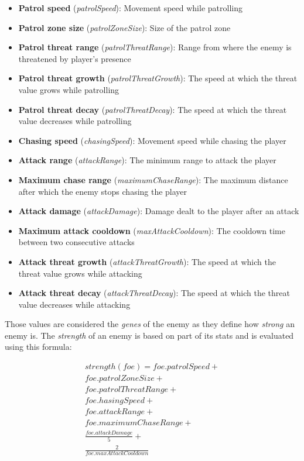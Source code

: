 \documentclass[11pt]{article}
\begin{document}
\begin{itemize}
  \item \textbf{Patrol speed} (\textit{patrolSpeed}): Movement speed while patrolling
  \item \textbf{Patrol zone size} (\textit{patrolZoneSize}): Size of the patrol zone
  \item \textbf{Patrol threat range} (\textit{patrolThreatRange}): Range from where the enemy is threatened by player's presence
  \item \textbf{Patrol threat growth} (\textit{patrolThreatGrowth}): The speed at which the threat value grows while patrolling
  \item \textbf{Patrol threat decay} (\textit{patrolThreatDecay}): The speed at which the threat value decreases while patrolling

  \item \textbf{Chasing speed} (\textit{chasingSpeed}): Movement speed while chasing the player
  \item \textbf{Attack range} (\textit{attackRange}): The minimum range to attack the player
  \item \textbf{Maximum chase range} (\textit{maximumChaseRange}): The maximum distance after which the enemy stops chasing the player
  \item \textbf{Attack damage} (\textit{attackDamage}): Damage dealt to the player after an attack
  \item \textbf{Maximum attack cooldown} (\textit{maxAttackCooldown}): The cooldown time between two consecutive attacks
  \item \textbf{Attack threat growth} (\textit{attackThreatGrowth}): The speed at which the threat value grows while attacking
  \item \textbf{Attack threat decay} (\textit{attackThreatDecay}): The speed at which the threat value decreases while attacking
\end{itemize}

Those values are considered the \textit{genes} of the enemy as they define how \textit{strong} an enemy is. The \textit{strength} of an enemy is based on part of its stats and is evaluated using this formula:

\begin{gather*}
  strength(foe) =
    foe.patrolSpeed + \\
    foe.patrolZoneSize + \\
    foe.patrolThreatRange + \\
    foe.hasingSpeed + \\
    foe.attackRange + \\
    foe.maximumChaseRange + \\
    \frac{foe.attackDamage}{5} + \\
    \frac{2}{foe.maxAttackCooldown}
\end{gather*}
\end{document}
